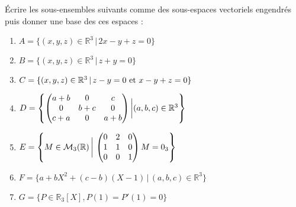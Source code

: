 \documentclass[a4paper,twoside,french,11pt]{VcCours}
\begin{document}
\begin{Exercice}{}Écrire les sous-ensembles suivants comme des sous-espaces vectoriels engendrés puis donner une base des ces espaces :

\begin{multicols}{2}
\begin{enumerate}
\item $A=\lbrace (x,y,z) \in \mathbb{R}^3 \, \vert  \, 2x-y+z=0 \rbrace$
\item $B= \lbrace (x,y,z) \in \mathbb{R}^3 \, \vert \, z+y=0 \rbrace$
\item $C= \lbrace (x,y,z) \in \mathbb{R}^3 \, \vert \, z-y=0 \hbox{ et } x-y+z=0 \rbrace$

\item $D = \left\lbrace \begin{pmatrix}
a+b & 0 & c \\
0 & b+c & 0 \\
c+a & 0& a+b 
\end{pmatrix} \bigg{\vert} (a,b,c) \in \mathbb{R}^3 \right\rbrace$

\columnbreak
\item $E = \left\lbrace M \in \mathcal{M}_3(\mathbb{R}) \, \bigg{\vert} \, \begin{pmatrix}
0 & 2 & 0 \\
1 & 1 & 0 \\
0 & 0 & 1 
\end{pmatrix} M=0_3 \right\rbrace$
\item $F= \lbrace a + bX^2 + (c-b)(X-1) \, \vert \, (a,b,c) \in \mathbb{R}^3 \rbrace$
\item $G = \lbrace P \in \mathbb{R}_3[X], P(1)=P'(1)=0 \rbrace$
\end{enumerate}
\end{multicols}

\vspace{0.05cm}
\end{Exercice}

\corr 
\end{document}
